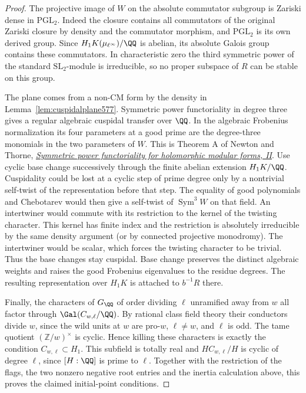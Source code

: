 \documentclass[a4paper,11pt]{article}
\theoremstyle{definition}
\theoremstyle{remark}
\newcommand{\ZZ}{\mathbb Z}\newcommand{\ord}{\operatorname{ord}}
\numberwithin{equation}{section}
\begin{document}
\begin{proof}
The projective image of \(W\) on the absolute commutator
subgroup is Zariski dense in \(\mathrm{PGL}_2\). Indeed the
closure contains all commutators of the original Zariski
closure by density and the commutator morphism, and
\(\mathrm{PGL}_2\) is its own derived group. Since
\(H_1K(\mu_{\ell^\infty})/\QQ\) is abelian, its absolute
Galois group contains these commutators. In characteristic
zero the third symmetric power of the standard
\(\mathrm{SL}_2\)-module is irreducible, so no proper
subspace of \(R\) can be stable on this group.

The plane comes from a non-CM form by the density in
Lemma~\ref{lem:cuspidalplane577}. Symmetric power
functoriality in degree three gives a regular algebraic
cuspidal transfer over \(\QQ\). In the algebraic Frobenius
normalization its four parameters at a good prime are the
degree-three monomials in the two parameters of \(W\).
This is Theorem A of Newton and Thorne,
\href{https://pmihes.centre-mersenne.org/articles/10.1007/s10240-021-00126-4/}{\emph{Symmetric
power functoriality for holomorphic modular forms, II}}.
Use cyclic base change successively through the finite abelian
extension \(H_1K/\QQ\). Cuspidality could be lost at a cyclic
step of prime degree only by a nontrivial self-twist of the
representation before that step. The equality of good
polynomials and Chebotarev would then give a self-twist of
\(\operatorname{Sym}^3 W\) on that field. An intertwiner
would commute with its restriction to the kernel of the
twisting character. This kernel has finite index and the
restriction is absolutely irreducible by the same density
argument (or by connected projective monodromy). The
intertwiner would be scalar, which forces the twisting
character to be trivial. Thus the base changes stay
cuspidal. Base change preserves the distinct algebraic
weights and raises the good Frobenius eigenvalues to the
residue degrees. The resulting representation over \(H_1K\)
is attached to \(b^{-1}R\) there.~\cite{XII-IX-I-ac123}

Finally, the characters of \(G_\QQ\) of order dividing
\(\ell\) unramified away from \(w\) all factor through
\(\Gal(C_{w,\ell}/\QQ)\). By rational class field theory
their conductors divide \(w\), since the wild units at \(w\)
are pro-\(w\), \(\ell\ne w\), and \(\ell\) is odd. The tame
quotient \((\ZZ/w)^\times\) is cyclic. Hence killing these
characters is exactly the condition \(C_{w,\ell}\subset H_1\).
This subfield is totally real and \(HC_{w,\ell}/H\) is cyclic
of degree \(\ell\), since \([H:\QQ]\) is prime to \(\ell\).
Together with the restriction of the flags, the two nonzero
negative root entries and the inertia calculation above,
this proves the claimed initial-point conditions.
\end{proof}
\end{document}
